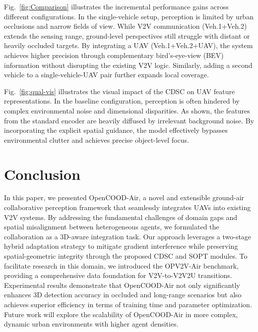 \documentclass[conference]{IEEEtran}
\begin{document}
Fig.~\ref{fig:Comparison} illustrates the incremental performance gains across different configurations. In the single-vehicle setup, perception is limited by urban occlusions and narrow fields of view. While V2V communication (Veh.1+Veh.2) extends the sensing range, ground-level perspectives still struggle with distant or heavily occluded targets. By integrating a UAV (Veh.1+Veh.2+UAV), the system achieves higher precision through complementary bird’s-eye-view (BEV) information without disrupting the existing V2V logic. Similarly, adding a second vehicle to a single-vehicle-UAV pair further expands local coverage.

Fig.~\ref{fig:qual-vis} illustrates the visual impact of the CDSC on UAV feature representations. In the baseline configuration, perception is often hindered by complex environmental noise and dimensional disparities. As shown, the features from the standard encoder are heavily diffused by irrelevant background noise. By incorporating the explicit spatial guidance, the model effectively bypasses environmental clutter and achieves precise object-level focus. 



\section{Conclusion}
In this paper, we presented OpenCOOD-Air, a novel and extensible ground-air collaborative perception framework that seamlessly integrates UAVs into existing V2V systems. By addressing the fundamental challenges of domain gaps and spatial misalignment between heterogeneous agents, we formulated the collaboration as a 3D-aware integration task. Our approach leverages a two-stage hybrid adaptation strategy to mitigate gradient interference while preserving spatial-geometric integrity through the proposed CDSC and SOPT modules. To facilitate research in this domain, we introduced the OPV2V-Air benchmark, providing a comprehensive data foundation for V2V-to-V2V2U transitions. Experimental results demonstrate that OpenCOOD-Air not only significantly enhances 3D detection accuracy in occluded and long-range scenarios but also achieves superior efficiency in terms of training time and parameter optimization. Future work will explore the scalability of OpenCOOD-Air in more complex, dynamic urban environments with higher agent densities.





\vspace{12pt}


\end{document}
